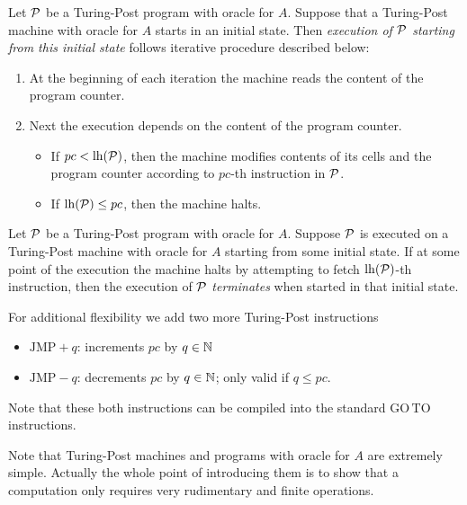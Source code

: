 \documentclass[10pt]{amsart}
\begin{document}
\begin{definition}
	Let ${\mathcal P}$ be a Turing-Post program with oracle for $A$. Suppose that a Turing-Post machine with oracle for $A$ starts in an initial state. Then \textit{execution of ${\mathcal P}$ starting from this initial state} follows iterative procedure described below:
	\begin{enumerate}[label=\textbf{(\arabic*)}, leftmargin=3.0em]
		\item At the beginning of each iteration the machine reads the content of the program counter.
		\item Next the execution depends on the content of the program counter.
		      \begin{itemize}
			      \item[] If $pc < \mathrm{lh}({\mathcal P})$, then the machine modifies contents of its cells and the program counter according to $pc$-th instruction in ${\mathcal P}$.
			      \item[] If $\mathrm{lh}({\mathcal P}) \leq pc$, then the machine halts.
		      \end{itemize}
	\end{enumerate}
\end{definition}

\begin{definition}
	Let ${\mathcal P}$ be a Turing-Post program with oracle for $A$. Suppose ${\mathcal P}$ is executed on a Turing-Post machine with oracle for $A$ starting from some initial state. If at some point of the execution the machine halts by attempting to fetch $\mathrm{lh}({\mathcal P})$-th instruction, then the execution of ${\mathcal P}$ \textit{terminates} when started in that initial state.
\end{definition}

\begin{remark}\label{remark:relative_jumps}
	For additional flexibility we add two more Turing-Post instructions
	\begin{itemize}
		\item[] $\mathrm{JMP}+q$: increments $pc$ by $q \in {\mathbb N}$
		\item[] $\mathrm{JMP}-q$: decrements $pc$ by $q \in {\mathbb N}$; only valid if $q \leq pc$.
	\end{itemize}
	Note that these both instructions can be compiled into the standard $\mathrm{GO\,TO}$ instructions.
\end{remark}
\noindent
Note that Turing-Post machines and programs with oracle for $A$ are extremely simple. Actually the whole point of introducing them is to show that a computation only requires very rudimentary and finite operations.
\end{document}
